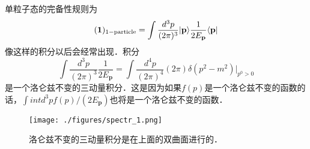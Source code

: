 单粒子态的完备性规则为
\begin{equation}
(\boldsymbol 1)_{\rm 1-particle} = \int \frac{d^3p}{(2\pi)^3} |\mathbf p\rangle \frac{1}{2 E_{\mathbf p}} \langle \mathbf p |
\end{equation}
像这样的积分以后会经常出现．积分
\begin{equation}
\int \frac{d^3p}{(2\pi)^3} \frac{1}{2 E_{\mathbf p}} = \int \frac{d^4 p}{(2\pi)^4} (2\pi) \delta(p^2 - m^2) \bigg|_{p^0>0}
\end{equation}
是一个洛仑兹不变的三动量积分．这是因为如果$f(p)$是一个洛仑兹不变的函数的话，$\int int d^3 p f(p)/(2E_{\mathbf p})$也将是一个洛仑兹不变的函数．
\begin{figure}[ht]
\centering
\texttt{[image: ./figures/spectr\_1.png]}
\caption{洛仑兹不变的三动量积分是在上面的双曲面进行的．} \label{spectr_fig1}
\end{figure}
